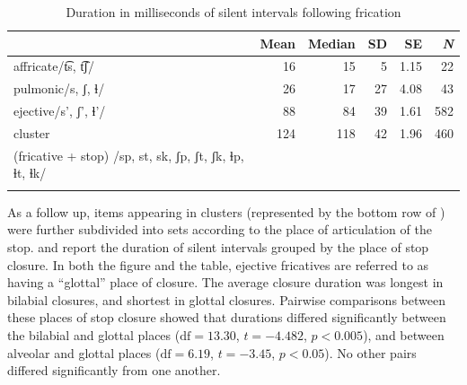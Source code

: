 \documentclass[output=paper,colorlinks,citecolor=brown]{langscibook}
\begin{document}
   \begin{table}
        \centering
    	\caption[Summary of silent intervals following frication]{Duration in milliseconds of silent intervals following frication}
    	\label{tab:lag-condition-summary}

    	\begin{tabularx}{\textwidth}{Q rrrrr}
    		\lsptoprule
    		&{Mean}&{Median}&{SD}&{SE}&{\textit{N}}\\
    		\midrule
    		affricate\newline /t͡s, t͡ʃ/ &16 &15 &5 &1.15&22\\
    		\tablevspace
    		pulmonic\newline /s, ʃ, ɬ/ &26 &17 &27 &4.08&43\\
    		\tablevspace
    		ejective\newline /s', ʃ', ɬ'/ &88 &84 &39 &1.61&582\\
    		\tablevspace
    		cluster &124 &118 &42 &1.96&460\\
                (fricative + stop) \newline /sp, st, sk, ʃp, ʃt, ʃk, ɬp, ɬt, ɬk/\\
    		\lspbottomrule
    	\end{tabularx}
    \end{table}

As a follow up, items appearing in clusters (represented by the bottom row of ) were further subdivided into sets according to the place of articulation of the stop.  and  report the duration of silent intervals grouped by the place of stop closure. In both the figure and the table, ejective fricatives are referred to as having a ``glottal'' place of closure. The average closure duration was longest in bilabial closures, and shortest in glottal closures. Pairwise comparisons between these places of stop closure showed that durations differed significantly between the bilabial and glottal places ($\text{df} = 13.30$, $t = -4.482$, $p < 0.005$), and between alveolar and glottal places ($\text{df} = 6.19$, $t = -3.45$, $p < 0.05$). No other pairs differed significantly from one another.
\end{document}
